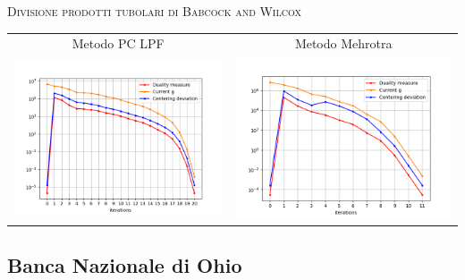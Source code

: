 \begin{frame}{\textsc{\LARGE \textcolor{iris}{Divisione prodotti tubolari di Babcock and Wilcox}}}
	\centering
	\begin{tabular}{c@{}c}
		\small{Metodo PC LPF} & \small{Metodo Mehrotra} \\
		\includegraphics[scale = 0.33]{tub_PCLPF}
		&\includegraphics[scale = 0.33]{tub_MER2}\\ 
	\end{tabular}
\end{frame}


\subsection{Banca Nazionale di Ohio}

